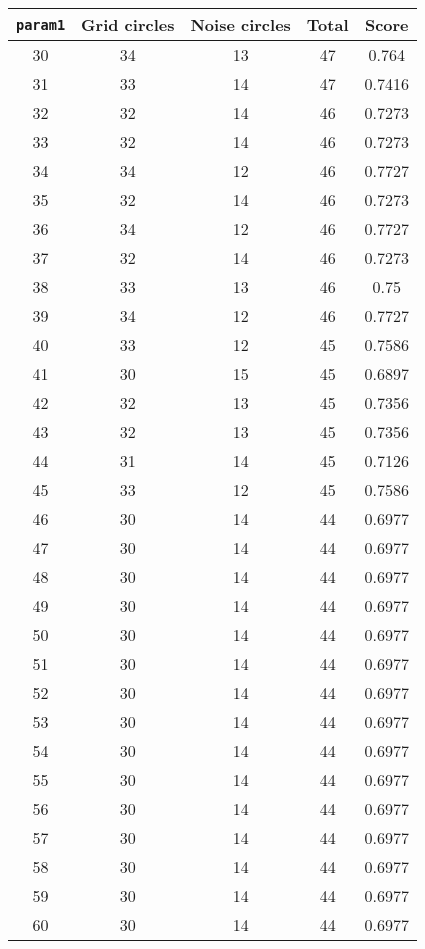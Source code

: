 \documentclass[letterpaper, 12pt]{article}
\begin{document}
\begin{longtable}{|c|c|c|c|c|}
\hline
\textbf{\texttt{param1}} & \textbf{Grid circles} & \textbf{Noise circles} & \textbf{Total} & \textbf{Score} \\
\hline
30 & 34 & 13 & 47 & 0.764 \\
\hline
31 & 33 & 14 & 47 & 0.7416 \\
\hline
32 & 32 & 14 & 46 & 0.7273 \\
\hline
33 & 32 & 14 & 46 & 0.7273 \\
\hline
34 & 34 & 12 & 46 & 0.7727 \\
\hline
35 & 32 & 14 & 46 & 0.7273 \\
\hline
36 & 34 & 12 & 46 & 0.7727 \\
\hline
37 & 32 & 14 & 46 & 0.7273 \\
\hline
38 & 33 & 13 & 46 & 0.75 \\
\hline
39 & 34 & 12 & 46 & 0.7727 \\
\hline
40 & 33 & 12 & 45 & 0.7586 \\
\hline
41 & 30 & 15 & 45 & 0.6897 \\
\hline
42 & 32 & 13 & 45 & 0.7356 \\
\hline
43 & 32 & 13 & 45 & 0.7356 \\
\hline
44 & 31 & 14 & 45 & 0.7126 \\
\hline
45 & 33 & 12 & 45 & 0.7586 \\
\hline
46 & 30 & 14 & 44 & 0.6977 \\
\hline
47 & 30 & 14 & 44 & 0.6977 \\
\hline
48 & 30 & 14 & 44 & 0.6977 \\
\hline
49 & 30 & 14 & 44 & 0.6977 \\
\hline
50 & 30 & 14 & 44 & 0.6977 \\
\hline
51 & 30 & 14 & 44 & 0.6977 \\
\hline
52 & 30 & 14 & 44 & 0.6977 \\
\hline
53 & 30 & 14 & 44 & 0.6977 \\
\hline
54 & 30 & 14 & 44 & 0.6977 \\
\hline
55 & 30 & 14 & 44 & 0.6977 \\
\hline
56 & 30 & 14 & 44 & 0.6977 \\
\hline
57 & 30 & 14 & 44 & 0.6977 \\
\hline
58 & 30 & 14 & 44 & 0.6977 \\
\hline
59 & 30 & 14 & 44 & 0.6977 \\
\hline
60 & 30 & 14 & 44 & 0.6977 \\

\end{longtable}
\end{document}
